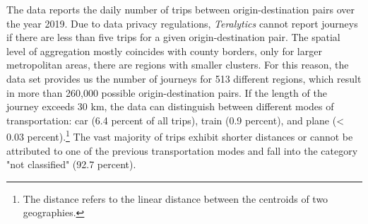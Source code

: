 The data reports the daily number of trips between origin-destination pairs over the year 2019. Due to data privacy regulations, \textit{Teralytics} cannot report journeys if there are less than five trips for a given origin-destination pair. The spatial level of aggregation mostly coincides with county borders, only for larger metropolitan areas, there are regions with smaller clusters. For this reason, the data set provides us the number of journeys for 513 different regions, which result in more than 260,000 possible origin-destination pairs. If the length of the journey exceeds 30 km, the data can distinguish between different modes of transportation: car (6.4 percent of all trips), train (0.9 percent), and plane (< 0.03 percent).\footnote{The distance refers to the linear distance between the centroids of two geographies.} The vast majority of trips exhibit shorter distances or cannot be attributed to one of the previous transportation modes and fall into the category "not classified" (92.7 percent).







